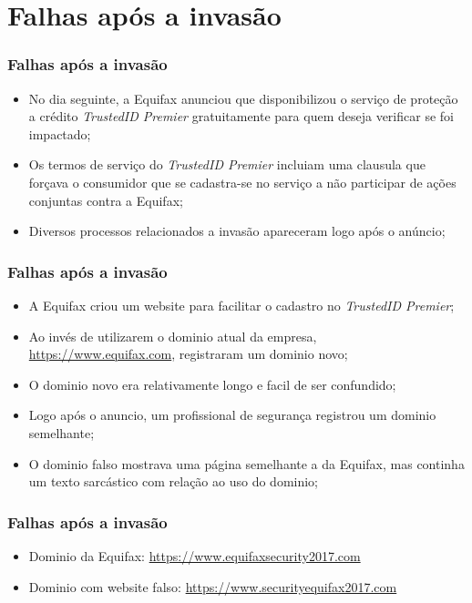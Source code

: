 \documentclass{beamer}
\begin{document}
	\section{Falhas após a invasão}
	\begin{frame}
		\frametitle{Falhas após a invasão}
		\begin{itemize}
			\item No dia seguinte, a Equifax anunciou que disponibilizou o serviço de proteção a crédito \textit{TrustedID Premier} gratuitamente para quem deseja verificar se foi impactado;
			\item Os termos de serviço do \textit{TrustedID Premier} incluiam uma clausula que forçava o consumidor que se cadastra-se no serviço a não participar de ações conjuntas contra a Equifax;
			\item Diversos processos relacionados a invasão apareceram logo após o anúncio;
		\end{itemize}
	\end{frame}
	\begin{frame}
		\frametitle{Falhas após a invasão}
		\begin{itemize}
			\item A Equifax criou um website para facilitar o cadastro no \textit{TrustedID Premier};
			\item Ao invés de utilizarem o dominio atual da empresa, \url{https://www.equifax.com}, registraram um dominio novo;
			\item O dominio novo era relativamente longo e facil de ser confundido;
			\item Logo após o anuncio, um profissional de segurança registrou um dominio semelhante;
			\item O dominio falso mostrava uma página semelhante a da Equifax, mas continha um texto sarcástico com relação ao uso do dominio; 
		\end{itemize}
	\end{frame}
	\begin{frame}
		\frametitle{Falhas após a invasão}
			\begin{itemize}
				\item Dominio da Equifax: \url{https://www.equifaxsecurity2017.com}
				\item Dominio com website falso: \url{https://www.securityequifax2017.com}
			\end{itemize}
	\end{frame}
	\begin{frame}
		\titlepage
	\end{frame}
\end{document}
